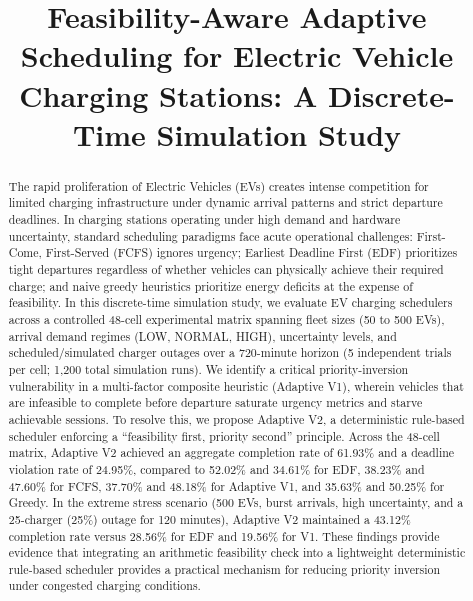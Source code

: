 \documentclass[conference]{IEEEtran}
\begin{document}
\title{Feasibility-Aware Adaptive Scheduling for Electric Vehicle Charging Stations: A Discrete-Time Simulation Study}

\author{
}

\maketitle

\begin{abstract}
The rapid proliferation of Electric Vehicles (EVs) creates intense competition for limited charging infrastructure under dynamic arrival patterns and strict departure deadlines. In charging stations operating under high demand and hardware uncertainty, standard scheduling paradigms face acute operational challenges: First-Come, First-Served (FCFS) ignores urgency; Earliest Deadline First (EDF) prioritizes tight departures regardless of whether vehicles can physically achieve their required charge; and naive greedy heuristics prioritize energy deficits at the expense of feasibility. In this discrete-time simulation study, we evaluate EV charging schedulers across a controlled 48-cell experimental matrix spanning fleet sizes (50 to 500 EVs), arrival demand regimes (LOW, NORMAL, HIGH), uncertainty levels, and scheduled/simulated charger outages over a 720-minute horizon (5 independent trials per cell; 1,200 total simulation runs). We identify a critical priority-inversion vulnerability in a multi-factor composite heuristic (Adaptive V1), wherein vehicles that are infeasible to complete before departure saturate urgency metrics and starve achievable sessions. To resolve this, we propose Adaptive V2, a deterministic rule-based scheduler enforcing a ``feasibility first, priority second'' principle. Across the 48-cell matrix, Adaptive V2 achieved an aggregate completion rate of 61.93\% and a deadline violation rate of 24.95\%, compared to 52.02\% and 34.61\% for EDF, 38.23\% and 47.60\% for FCFS, 37.70\% and 48.18\% for Adaptive V1, and 35.63\% and 50.25\% for Greedy. In the extreme stress scenario (500 EVs, burst arrivals, high uncertainty, and a 25-charger (25\%) outage for 120 minutes), Adaptive V2 maintained a 43.12\% completion rate versus 28.56\% for EDF and 19.56\% for V1. These findings provide evidence that integrating an arithmetic feasibility check into a lightweight deterministic rule-based scheduler provides a practical mechanism for reducing priority inversion under congested charging conditions.
\end{abstract}
\end{document}

